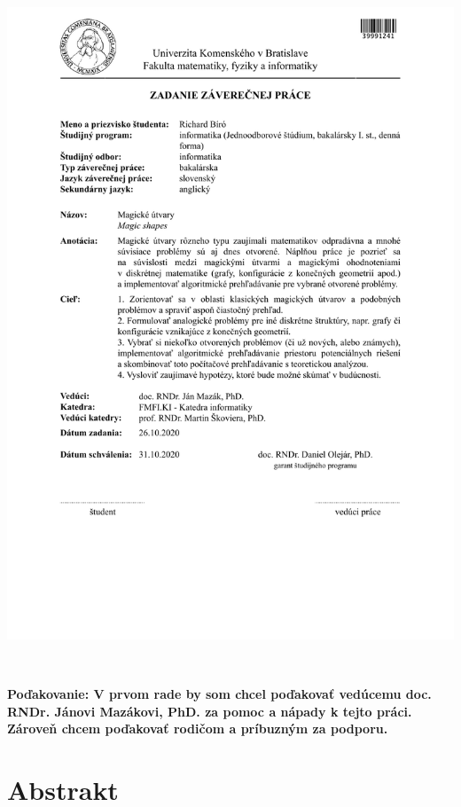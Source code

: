\documentclass[12pt, oneside]{book}  %
\begin{document}
\newpage 
\thispagestyle{empty}
\hspace{-2cm}\includegraphics[width=1.1\textwidth]{images/zadanie}


\frontmatter

\setcounter{page}{3}
\newpage 
~

\vfill
{\bf Poďakovanie: V prvom rade by som chcel poďakovať vedúcemu doc. RNDr. Jánovi Mazákovi, PhD. za pomoc a nápady k tejto práci. Zároveň chcem poďakovať rodičom a príbuzným za podporu. } 


\newpage 
\section*{Abstrakt}
\end{document}
